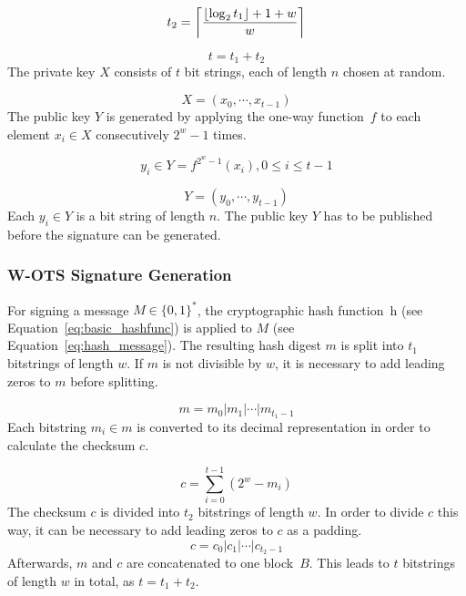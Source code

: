 \begin{equation}
\label{eq:t2}
t_2 = \ceil*{\frac{\floor*{\log_2 t_1} + 1 + w}{w} }
\end{equation}

\begin{equation}
\label{eq:t}
t = t_1 + t_2
\end{equation}
The private key $X$ consists of $t$ bit strings, each of length $n$ chosen at random.

\begin{equation}
\label{eq:wots_privkey}
X = (x_0, \cdots, x_{t-1})
\end{equation}
The public key $Y$ is generated by applying the one-way function~$f$ to each element $x_i  \in X$  consecutively $2^w - 1$ times. %

\begin{equation}
y_i \in Y =  f^{2^w-1}(x_i), 0 \leq i \leq t-1 
\end{equation}

\begin{equation}
Y = (y_0, \cdots, y_{t-1})
\end{equation}
Each $y_i \in Y$ is a bit string of length $n$. The public key $Y$ has to be published before the signature can be generated.

\subsubsection{W-OTS Signature Generation}
For signing a message $M \in \lbrace 0,1 \rbrace^*$, the cryptographic hash function~h (see Equation~\ref{eq:basic_hashfunc}) is applied to $M$ (see Equation~\ref{eq:hash_message}). The resulting hash digest $m$ is split into $t_1$ bitstrings of length $w$. If $m$ is not divisible by $w$, it is necessary to add leading zeros to $m$ before splitting.

\begin{equation}
\label{eq:hash_digest_split}
m = m_0 | m_1 | \cdots | m_{t_1-1}
\end{equation}
Each bitstring $m_i \in m$ is converted to its decimal representation in order to calculate the checksum $c$.

\begin{equation}
\label{eq:checksum_calculation}
c = \sum_{i = 0}^{t-1}(2^w-m_i)
\end{equation}
The checksum $c$ is divided into $t_2$ bitstrings of length $w$. In order to divide $c$ this way, it can be necessary to add leading zeros to $c$ as a padding.
\begin{equation}
c = c_0 | c_1 | \cdots | c_{t_2 - 1}
\end{equation}
Afterwards, $m$ and $c$ are concatenated to one block~$B$. This leads to $t$ bitstrings of length $w$ in total, as $t = t_1 + t_2$.

